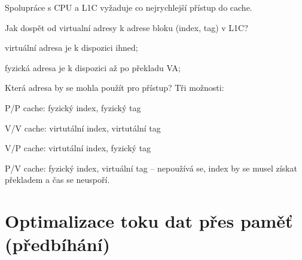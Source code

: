 \begin{compactitem}
    \item Spolupráce s CPU a L1C vyžaduje co nejrychlejší přístup do cache.

    \item Jak dospět od virtualní adresy k adrese bloku (index, tag) v L1C? \begin{compactitem}
        \item virtuální adresa je k dispozici ihned;
        \item fyzická adresa je k dispozici až po překladu VA;
    \end{compactitem}

    \item Která adresa by se mohla použít pro přístup? Tři možnosti: \begin{compactitem}
        \item P/P cache: fyzický index, fyzický tag
        \item V/V cache: virtutální index, virtutální tag
        \item V/P cache: virtutální index, fyzický tag
        \item P/V cache: fyzický index, virtuální tag -- nepoužívá se, index by se musel získat překladem a čas se neuspoří.
    \end{compactitem}
\end{compactitem}


\section{Optimalizace toku dat přes paměť (předbíhání)}

